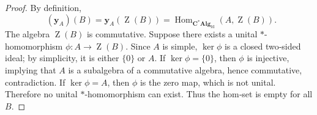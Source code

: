 \documentclass[10pt,a4paper]{amsart}
\newcommand{\CAlgfd}{\mathbf{C}^{*}\mathbf{Alg}_{\mathrm{fd}}}
\DeclareMathOperator{\Center}{Z}
\DeclareMathOperator{\Hom}{Hom}
\DeclareMathOperator{\Qpot}{Q^{\diamond}}
\begin{document}
\begin{proof}
By definition,
\[
\Qpot(\mathbf{y}_A)(B) = \mathbf{y}_A(\Center(B)) = \Hom_{\CAlgfd}(A,\Center(B)).
\]
The algebra \(\Center(B)\) is commutative.  Suppose there exists a unital \(*\)-homomorphism \(\phi : A \to \Center(B)\).  Since \(A\) is simple, \(\ker\phi\) is a closed two‑sided ideal; by simplicity, it is either \(\{0\}\) or \(A\).  If \(\ker\phi=\{0\}\), then \(\phi\) is injective, implying that \(A\) is a subalgebra of a commutative algebra, hence commutative, contradiction.  If \(\ker\phi = A\), then \(\phi\) is the zero map, which is not unital.  Therefore no unital \(*\)-homomorphism can exist.  Thus the hom‑set is empty for all \(B\). \qedhere
\end{proof}
\end{document}
